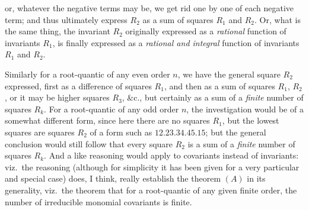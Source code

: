 \documentclass[11pt,a4paper]{book}
\begin{document}
or, whatever the negative terms may be, we get rid one by one of each negative term; and thus ultimately express $R_2$ as a sum of squares $R_1$ and $R_2$. Or, what is the same thing, the invariant $R_2$ originally expressed as a \textit{rational} function of invariants $R_1$, is finally expressed as a \textit{rational and integral} function of invariants $R_1$ and $R_2$.

Similarly for a root-quantic of any even order $n$, we have the general square $R_2$ expressed, first as a difference of squares $R_1$, and then as a sum of squares $R_1$, $R_2$, or it may be higher squares $R_3$, \&c., but certainly as a sum of a \textit{finite} number of squares $R_k$. For a root-quantic of any odd order $n$, the investigation would be of a somewhat different form, since here there are no squares $R_1$, but the lowest squares are squares $R_2$ of a form such as $12.23.34.45.15$; but the general conclusion would still follow that every square $R_2$ is a sum of a \textit{finite} number of squares $R_k$. And a like reasoning would apply to covariants instead of invariants: viz.\ the reasoning (although for simplicity it has been given for a very particular and special case) does, I think, really establish the theorem $(A)$ in its generality, viz.\ the theorem that for a root-quantic of any given finite order, the number of irreducible monomial covariants is finite.
\end{document}
